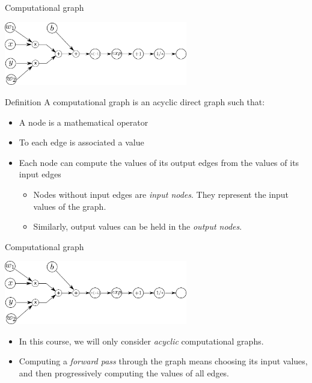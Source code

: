 \documentclass[xcolor=pdftex,dvipsnames,table,mathserif]{beamer}
\begin{document}
\begin{frame}{Computational graph}

  \begin{block}{}
    \centering
   \includegraphics[width=0.6\textwidth]{comp_graph2}\\
   \end{block}

  \begin{block}{Definition}
    A computational graph is an acyclic direct graph such that:
    \begin{itemize}
    \item A node is a mathematical operator
    \item To each edge is associated a value
    \item Each node can compute the values of its output edges from the values of its input edges
      \begin{itemize}
      \item Nodes without input edges are \emph{input nodes}. They represent the input values of the graph.
      \item Similarly, output values can be held in the \emph{output nodes}.
      \end{itemize}
    \end{itemize}
  \end{block}

\end{frame}

\begin{frame}{Computational graph}

  \begin{block}{}
    \centering
   \includegraphics[width=0.6\textwidth]{comp_graph2}\\
   \end{block}

  \begin{itemize}
  \item   In this course, we will only consider \emph{acyclic} computational graphs.
  \item   Computing a \emph{forward pass} through the graph means choosing its input values, and then progressively computing the values of all edges.
  \end{itemize}

\end{frame}
\end{document}
